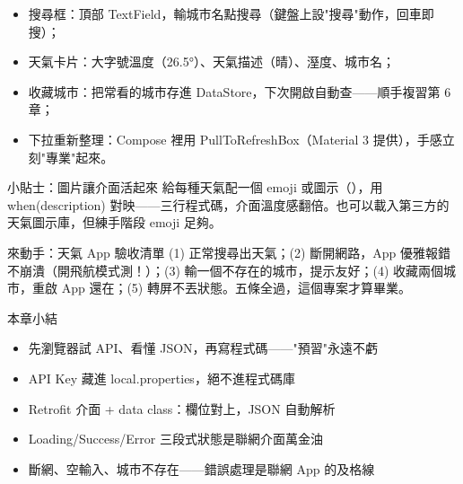 

\begin{itemize}
  \item 搜尋框：頂部 TextField，輸城市名點搜尋（鍵盤上設"搜尋"動作，回車即搜）；
  \item 天氣卡片：大字號溫度（26.5°）、天氣描述（晴）、溼度、城市名；
  \item 收藏城市：把常看的城市存進 DataStore，下次開啟自動查——順手複習第 6 章；
  \item 下拉重新整理：Compose 裡用 PullToRefreshBox（Material 3 提供），手感立刻"專業"起來。
\end{itemize}

\begin{tcbinfo}{小貼士：圖片讓介面活起來}
給每種天氣配一個 emoji 或圖示（），用 when(description) 對映——三行程式碼，介面溫度感翻倍。也可以載入第三方的天氣圖示庫，但練手階段 emoji 足夠。

\end{tcbinfo}

\begin{tcbpractice}{來動手：天氣 App 驗收清單}
(1) 正常搜尋出天氣；(2) 斷開網路，App 優雅報錯不崩潰（開飛航模式測！）；(3) 輸一個不存在的城市，提示友好；(4) 收藏兩個城市，重啟 App 還在；(5) 轉屏不丟狀態。五條全過，這個專案才算畢業。

\end{tcbpractice}

\begin{tcbsummary}{本章小結}
\begin{itemize}
  \item 先瀏覽器試 API、看懂 JSON，再寫程式碼——"預習"永遠不虧
  \item API Key 藏進 local.properties，絕不進程式碼庫
  \item Retrofit 介面 + data class：欄位對上，JSON 自動解析
  \item Loading/Success/Error 三段式狀態是聯網介面萬金油
  \item 斷網、空輸入、城市不存在——錯誤處理是聯網 App 的及格線
\end{itemize}

\end{tcbsummary}
